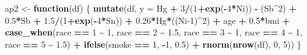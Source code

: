 \documentclass[12pt, twoside]{amherstthesis}
\newenvironment{Shaded}{\begin{snugshade}}{\end{snugshade}}
\newcommand{\AttributeTok}[1]{\textcolor[rgb]{0.13,0.29,0.53}{#1}}
\newcommand{\ControlFlowTok}[1]{\textcolor[rgb]{0.13,0.29,0.53}{\textbf{#1}}}
\newcommand{\DecValTok}[1]{\textcolor[rgb]{0.00,0.00,0.81}{#1}}
\newcommand{\FloatTok}[1]{\textcolor[rgb]{0.00,0.00,0.81}{#1}}
\newcommand{\FunctionTok}[1]{\textcolor[rgb]{0.13,0.29,0.53}{\textbf{#1}}}
\newcommand{\NormalTok}[1]{#1}
\newcommand{\OtherTok}[1]{\textcolor[rgb]{0.56,0.35,0.01}{#1}}
\newcommand{\SpecialCharTok}[1]{\textcolor[rgb]{0.81,0.36,0.00}{\textbf{#1}}}
\begin{document}
\begin{Shaded}
\begin{Highlighting}[]
\NormalTok{ap2 }\OtherTok{\textless{}{-}} \ControlFlowTok{function}\NormalTok{(df) \{}
  \FunctionTok{mutate}\NormalTok{(df, }\AttributeTok{y =} 
\NormalTok{           Hg }\SpecialCharTok{+} \DecValTok{3}\SpecialCharTok{/}\NormalTok{(}\DecValTok{1}\SpecialCharTok{+}\FunctionTok{exp}\NormalTok{(}\SpecialCharTok{{-}}\DecValTok{4}\SpecialCharTok{*}\NormalTok{Ni)) }\SpecialCharTok{{-}}\NormalTok{ (Sb}\SpecialCharTok{\^{}}\DecValTok{2}\NormalTok{) }\SpecialCharTok{+} \FloatTok{0.5}\SpecialCharTok{*}\NormalTok{Sb }\SpecialCharTok{+} \FloatTok{1.5}\SpecialCharTok{/}\NormalTok{(}\DecValTok{1}\SpecialCharTok{+}\FunctionTok{exp}\NormalTok{(}\SpecialCharTok{{-}}\DecValTok{4}\SpecialCharTok{*}\NormalTok{Sn)) }\SpecialCharTok{+} 
           \FloatTok{0.26}\SpecialCharTok{*}\NormalTok{Hg}\SpecialCharTok{*}\NormalTok{((Ni}\DecValTok{{-}1}\NormalTok{)}\SpecialCharTok{\^{}}\DecValTok{2}\NormalTok{) }\SpecialCharTok{+}
\NormalTok{           age }\SpecialCharTok{+} \FloatTok{0.5}\SpecialCharTok{*}\NormalTok{bmi }\SpecialCharTok{+} 
           \FunctionTok{case\_when}\NormalTok{(race }\SpecialCharTok{==} \DecValTok{1} \SpecialCharTok{\textasciitilde{}} \DecValTok{1}\NormalTok{, }
\NormalTok{                     race }\SpecialCharTok{==} \DecValTok{2} \SpecialCharTok{\textasciitilde{}} \FloatTok{1.5}\NormalTok{, }
\NormalTok{                     race }\SpecialCharTok{==} \DecValTok{3} \SpecialCharTok{\textasciitilde{}} \DecValTok{1}\NormalTok{, }
\NormalTok{                     race }\SpecialCharTok{==} \DecValTok{4} \SpecialCharTok{\textasciitilde{}} \DecValTok{1}\NormalTok{, }
\NormalTok{                     race }\SpecialCharTok{==} \DecValTok{5} \SpecialCharTok{\textasciitilde{}} \FloatTok{1.5}\NormalTok{) }\SpecialCharTok{+}
           \FunctionTok{ifelse}\NormalTok{(smoke }\SpecialCharTok{==} \DecValTok{1}\NormalTok{, }\SpecialCharTok{{-}}\DecValTok{1}\NormalTok{, }\FloatTok{0.5}\NormalTok{) }\SpecialCharTok{+}
           \FunctionTok{rnorm}\NormalTok{(}\FunctionTok{nrow}\NormalTok{(df), }\DecValTok{0}\NormalTok{, }\DecValTok{5}\NormalTok{))}
\NormalTok{\}}


\end{Highlighting}
\end{Shaded}
\end{document}
